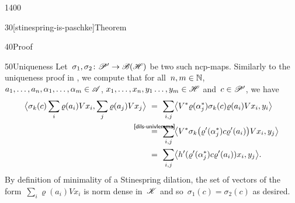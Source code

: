 \begin{parsec}{1400}
\begin{point}{30}[stinespring-is-paschke]{Theorem}
\begin{point}{40}{Proof}
\spacingfix{}
\begin{point}{50}{Uniqueness}%
    Let~$\sigma_1,\sigma_2\colon \mathscr{P}' \to \mathscr{B}(\mathscr{H})$
        be two such ncp-maps.
    Similarly to the uniqueness proof in ,
    we compute
        that for all~$n,m \in \mathbb{N}$,
        $a_1, \ldots, a_n,\alpha_1, \ldots, \alpha_m \in \mathscr{A}$,
        $x_1, \ldots, x_n,y_1 \ldots, y_m \in \mathscr{H}$
        and~$c \in \mathscr{P}'$, we have
\begin{align*}
    \bigl< \sigma_k(c)
        \sum_i \varrho(a_i) V x_i,
        \sum_j \varrho(a_j) V x_j \bigr>
    &\ = \ \sum_{i,j}
        \bigl< V^* \varrho(\alpha_j^*) \sigma_k(c) \varrho(a_i) V x_i, y_i
            \bigr> \\
            & \ \stackrel{\mathclap{\sref{dils-univlemma}}}{=} \ \sum_{i,j}
        \bigl< V^* \sigma_k \bigl(\varrho'(\alpha_j^*) c
            \varrho'(a_i)\bigr) V x_i, y_j\bigr> \\
    & \ =\  \sum_{i,j}
            \bigl< h'(\varrho'(\alpha_j^*) c \varrho'(a_i) )x_i, y_j
            \bigr>.
\end{align*}
By definition of minimality of a Stinespring dilation,
the set of vectors of the form~$\sum_i \varrho(a_i) Vx_i$
    is norm dense in~$\mathscr{K}$
    and so~$\sigma_1(c)=\sigma_2(c)$ as desired.
\end{point}

\spacingfix{}


\end{point}
\end{point}
\end{parsec}

